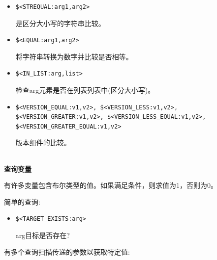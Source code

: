 \begin{itemize}
\item 
\begin{lstlisting}[style=styleCMake]
$<STREQUAL:arg1,arg2> 
\end{lstlisting}

是区分大小写的字符串比较。

\item 
\begin{lstlisting}[style=styleCMake]
$<EQUAL:arg1,arg2> 
\end{lstlisting}

将字符串转换为数字并比较是否相等。

\item 
\begin{lstlisting}[style=styleCMake]
$<IN_LIST:arg,list> 
\end{lstlisting}

检查arg元素是否在列表列表中(区分大小写)。

\item 
\begin{lstlisting}[style=styleCMake]
$<VERSION_EQUAL:v1,v2>, $<VERSION_LESS:v1,v2>,
$<VERSION_GREATER:v1,v2>, $<VERSION_LESS_EQUAL:v1,v2>,
$<VERSION_GREATER_EQUAL:v1,v2> 
\end{lstlisting}
版本组件的比较。
\end{itemize}

\hspace*{\fill} \\ %
\noindent
\textbf{查询变量}

有许多变量包含布尔类型的值。如果满足条件，则求值为1，否则为0。

简单的查询:

\begin{itemize}
\item 
\begin{lstlisting}[style=styleCMake]
$<TARGET_EXISTS:arg> 
\end{lstlisting}
arg目标是否存在?
\end{itemize}

有多个查询扫描传递的参数以获取特定值:

